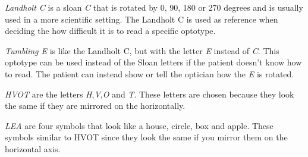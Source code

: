 \documentclass[12pt,a4paper,notitlepage]{report}
\begin{document}
\textit{Landholt C} is a sloan \textit{C} that is rotated by 0, 90, 180 or 270 degrees and is usually used in a more scientific setting. The Landholt C is used as reference when deciding the how difficult it is to read a specific optotype\cite{Colenbrander}.

\textit{Tumbling E} is like the Landholt C, but with the letter \textit{E} instead of \textit{C}. This optotype can be used instead of the Sloan letters if the patient doesn't know how to read. The patient can instead show or tell the optician how the \textit{E} is rotated\cite{Colenbrander}.

\textit{HVOT} are the letters \textit{H},\textit{V},\textit{O} and \textit{T}. These letters are chosen because they look the same if they are mirrored on the horizontally.

\textit{LEA} are four symbols that look like a house, circle, box and apple. These symbols similar to HVOT since they look the same if you mirror them on the horizontal axis.
\end{document}
